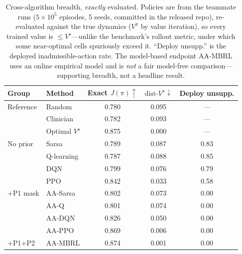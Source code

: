 \documentclass{article}
\newcommand{\dist}{\mathrm{dist}\text{-}V^\star}
\begin{document}
\begin{table}[t]
\centering
\caption{Cross-algorithm breadth, \emph{exactly} evaluated. Policies are from the
teammate runs ($5{\times}10^5$ episodes, 5 seeds, committed in the released repo),
re-evaluated against the true dynamics ($V^\pi$ by value iteration), so every trained
value is $\le V^\star$---unlike the benchmark's rollout metric, under which some
near-optimal cells spuriously exceed it. ``Deploy unsupp.'' is the deployed
inadmissible-action rate. The model-based endpoint AA-MBRL uses an online empirical
model and is \emph{not} a fair model-free comparison---supporting breadth, not a
headline result.}
\label{tab:merged}
\begin{tabular}{llccc}
\toprule
Group & Method & Exact $J(\pi)\uparrow$ & $\dist\downarrow$ & Deploy unsupp. \\
\midrule
Reference & Random            & 0.780 & 0.095 & --- \\
          & Clinician         & 0.782 & 0.093 & --- \\
          & Optimal $V^\star$ & 0.875 & 0.000 & --- \\
\midrule
No prior  & Sarsa       & 0.789 & 0.087 & 0.83 \\
          & Q-learning  & 0.787 & 0.088 & 0.85 \\
          & DQN         & 0.799 & 0.076 & 0.79 \\
          & PPO         & 0.842 & 0.033 & 0.58 \\
\midrule
$+$P1 mask & AA-Sarsa   & 0.802 & 0.073 & 0.00 \\
          & AA-Q        & 0.801 & 0.074 & 0.00 \\
          & AA-DQN      & 0.826 & 0.050 & 0.00 \\
          & AA-PPO      & 0.869 & 0.006 & 0.00 \\
\midrule
$+$P1$+$P2 & AA-MBRL    & 0.874 & 0.001 & 0.00 \\
\bottomrule
\end{tabular}
\end{table}
\end{document}
